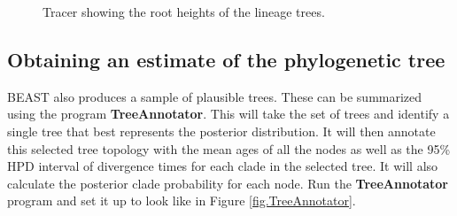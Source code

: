 \documentclass{article}
\begin{document}
\begin{figure}
\begin{center}


\end{center}
\caption{\label{fig.tracer2} Tracer showing the root heights of the lineage trees.}
\end{figure}


\subsection*{Obtaining an estimate of the phylogenetic tree}

BEAST also produces a sample of plausible trees. 
These can be summarized using the program {\bf TreeAnnotator}. This will take the set of trees and identify a single tree that best represents the posterior distribution. It will then annotate this selected tree topology with the mean ages of all the
nodes as well as the 95\% HPD interval of divergence times for each clade in the selected tree. It will also calculate the posterior clade probability for each
node. Run the {\bf TreeAnnotator} program and set it up to look like in Figure \ref{fig.TreeAnnotator}.
\end{document}
